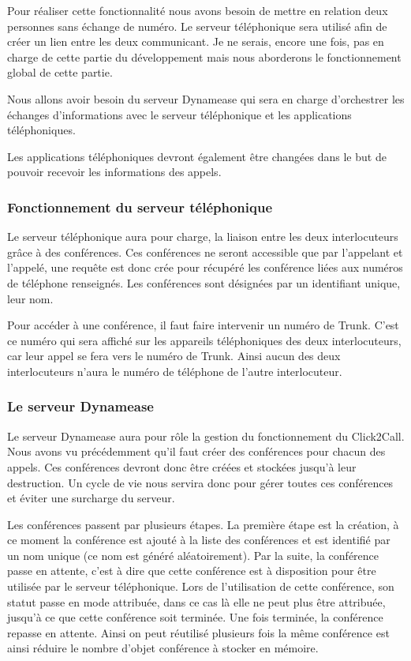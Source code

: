 Pour réaliser cette fonctionnalité nous avons besoin de mettre en relation deux personnes sans échange de numéro. Le serveur téléphonique sera utilisé afin de créer un lien entre les deux communicant. Je ne serais, encore une fois, pas en charge de cette partie du développement mais nous aborderons le fonctionnement global de cette partie.

Nous allons avoir besoin du serveur Dynamease qui sera en charge d'orchestrer les échanges d'informations avec le serveur téléphonique et les applications téléphoniques.

Les applications téléphoniques devront également être changées dans le but de pouvoir recevoir les informations des appels.

\subsubsection{Fonctionnement du serveur téléphonique}

Le serveur téléphonique aura pour charge, la liaison entre les deux interlocuteurs grâce à des conférences. Ces conférences ne seront accessible que par l'appelant et l'appelé, une requête est donc crée pour récupéré les conférence liées aux numéros de téléphone renseignés. Les conférences sont désignées par un identifiant unique, leur nom.

Pour accéder à une conférence, il faut faire intervenir un numéro de Trunk. C'est ce numéro qui sera affiché sur les appareils téléphoniques des deux interlocuteurs, car leur appel se fera vers le numéro de Trunk. Ainsi aucun des deux interlocuteurs n'aura le numéro de téléphone de l'autre interlocuteur.

\subsubsection{Le serveur Dynamease}

Le serveur Dynamease aura pour rôle la gestion du fonctionnement du Click2Call. Nous avons vu précédemment qu'il faut créer des conférences pour chacun des appels. Ces conférences devront donc être créées et stockées jusqu'à leur destruction. Un cycle de vie nous servira donc pour gérer toutes ces conférences et éviter une surcharge du serveur.

Les conférences passent par plusieurs étapes. La première étape est la création, à ce moment la conférence est ajouté à la liste des conférences et est identifié par un nom unique (ce nom est généré aléatoirement). Par la suite, la conférence passe en attente, c'est à dire que cette conférence est à disposition pour être utilisée par le serveur téléphonique. Lors de l'utilisation de cette conférence, son statut passe en mode attribuée, dans ce cas là elle ne peut plus être attribuée, jusqu'à ce que cette conférence soit terminée. Une fois terminée, la conférence repasse en attente. Ainsi on peut réutilisé plusieurs fois la même conférence est ainsi réduire le nombre d'objet conférence à stocker en mémoire.

